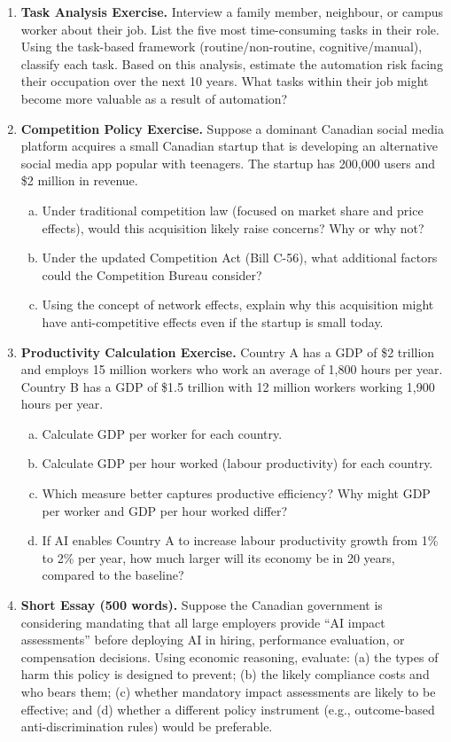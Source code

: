 \begin{enumerate}

\item \textbf{Task Analysis Exercise.} Interview a family member, neighbour, or campus worker about their job. List the five most time-consuming tasks in their role. Using the task-based framework (routine/non-routine, cognitive/manual), classify each task. Based on this analysis, estimate the automation risk facing their occupation over the next 10 years. What tasks within their job might become more valuable as a result of automation?

\item \textbf{Competition Policy Exercise.} Suppose a dominant Canadian social media platform acquires a small Canadian startup that is developing an alternative social media app popular with teenagers. The startup has 200,000 users and \$2 million in revenue.
  \begin{enumerate}[(a)]
    \item Under traditional competition law (focused on market share and price effects), would this acquisition likely raise concerns? Why or why not?
    \item Under the updated Competition Act (Bill C-56), what additional factors could the Competition Bureau consider?
    \item Using the concept of network effects, explain why this acquisition might have anti-competitive effects even if the startup is small today.
  \end{enumerate}

\item \textbf{Productivity Calculation Exercise.} Country A has a GDP of \$2 trillion and employs 15 million workers who work an average of 1,800 hours per year. Country B has a GDP of \$1.5 trillion with 12 million workers working 1,900 hours per year.
  \begin{enumerate}[(a)]
    \item Calculate GDP per worker for each country.
    \item Calculate GDP per hour worked (labour productivity) for each country.
    \item Which measure better captures productive efficiency? Why might GDP per worker and GDP per hour worked differ?
    \item If AI enables Country A to increase labour productivity growth from 1\% to 2\% per year, how much larger will its economy be in 20 years, compared to the baseline?
  \end{enumerate}

\item \textbf{Short Essay (500 words).} Suppose the Canadian government is considering mandating that all large employers provide ``AI impact assessments'' before deploying AI in hiring, performance evaluation, or compensation decisions. Using economic reasoning, evaluate: (a) the types of harm this policy is designed to prevent; (b) the likely compliance costs and who bears them; (c) whether mandatory impact assessments are likely to be effective; and (d) whether a different policy instrument (e.g., outcome-based anti-discrimination rules) would be preferable.

\end{enumerate}
